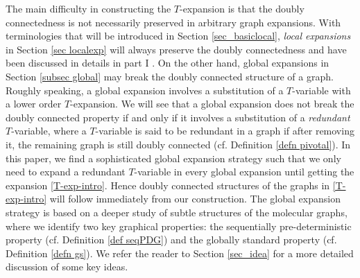 \documentclass{article}
\newcommand{\1}{\mathds{1}}
\numberwithin{equation}{section}
\theoremstyle{plain} %
\theoremstyle{remark}
\newcommand{\cor}{\color{red}}
\begin{document}
The main difficulty in constructing the $T$-expansion is that the doubly connectedness is not necessarily preserved in arbitrary graph expansions. With terminologies that will be introduced in Section \ref{sec_basiclocal}, \emph{local expansions} in Section \ref{sec localexp} will always preserve the doubly connectedness and have been discussed in details in part I \cite{PartI_high}. On the other hand, global expansions in Section \ref{subsec global} may break the doubly connected structure of a graph. Roughly speaking, a global expansion involves a substitution of a $T$-variable with a lower order $T$-expansion. We will see that a global expansion does not break the doubly connected property if and only if it involves a substitution of a \emph{redundant} $T$-variable, where a $T$-variable is said to be redundant in a graph if after removing it, the remaining graph is still doubly connected (cf. Definition \ref{defn pivotal}). In this paper, we find a sophisticated global expansion strategy such that we only need to expand a redundant $T$-variable in every global expansion until getting the expansion \eqref{T-exp-intro}. Hence doubly connected structures of the graphs in \eqref{T-exp-intro} will follow immediately from our construction. The global expansion strategy is based on a deeper study of subtle structures of the molecular graphs, where we identify two key graphical properties: the sequentially pre-deterministic property (cf. Definition \ref{def seqPDG}) and the globally standard property (cf. Definition \ref{defn gs}).   
We refer the reader to Section \ref{sec_idea} for a more detailed discussion of some key ideas.


\medskip
\end{document}
